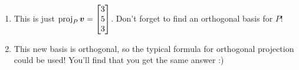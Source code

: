\begin{enumerate}
		\item This is just \(\operatorname{proj}_P \bm{v} = \begin{bmatrix}3 \\ 5 \\ 3\end{bmatrix}\). Don't forget to find an orthogonal basis for \(P\)!
		\item This new basis is orthogonal, so the typical formula for orthogonal projection could be used! You'll find that you get the same answer :)
	\end{enumerate}

